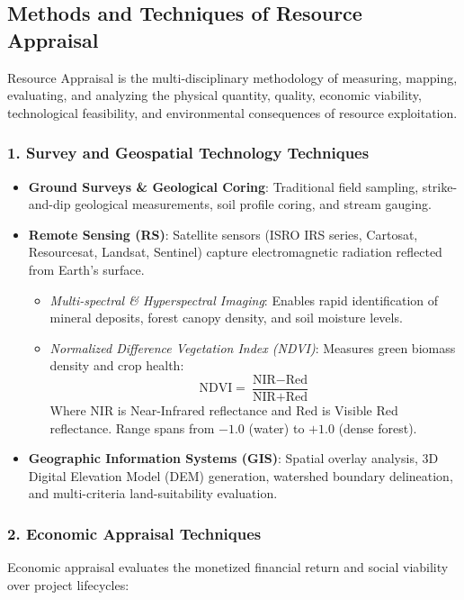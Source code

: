 \documentclass[11pt,a4paper]{article}
\begin{document}
\subsection{Methods and Techniques of Resource Appraisal}

\begin{defbox}
Resource Appraisal is the multi-disciplinary methodology of measuring, mapping, evaluating, and analyzing the physical quantity, quality, economic viability, technological feasibility, and environmental consequences of resource exploitation.
\end{defbox}

\subsubsection{1. Survey and Geospatial Technology Techniques}
\begin{itemize}[leftmargin=*]
  \item \textbf{Ground Surveys \& Geological Coring}: Traditional field sampling, strike-and-dip geological measurements, soil profile coring, and stream gauging.
  \item \textbf{Remote Sensing (RS)}: Satellite sensors (ISRO IRS series, Cartosat, Resourcesat, Landsat, Sentinel) capture electromagnetic radiation reflected from Earth's surface.
  \begin{itemize}
    \item \textit{Multi-spectral \& Hyperspectral Imaging}: Enables rapid identification of mineral deposits, forest canopy density, and soil moisture levels.
    \item \textit{Normalized Difference Vegetation Index (NDVI)}: Measures green biomass density and crop health:
    \begin{equation}
      \text{NDVI} = \frac{\text{NIR} - \text{Red}}{\text{NIR} + \text{Red}}
    \end{equation}
    Where NIR is Near-Infrared reflectance and Red is Visible Red reflectance. Range spans from $-1.0$ (water) to $+1.0$ (dense forest).
  \end{itemize}
  \item \textbf{Geographic Information Systems (GIS)}: Spatial overlay analysis, 3D Digital Elevation Model (DEM) generation, watershed boundary delineation, and multi-criteria land-suitability evaluation.
\end{itemize}

\subsubsection{2. Economic Appraisal Techniques}
Economic appraisal evaluates the monetized financial return and social viability over project lifecycles:
\end{document}
